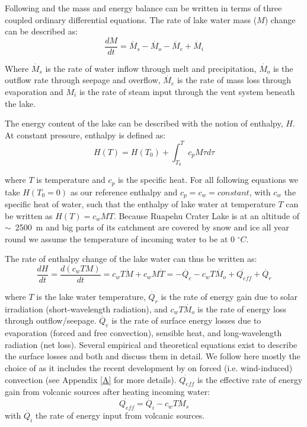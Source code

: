 \documentclass{bmc_template/bmcart}
\begin{document}
Following \cite{Hurst1991} and \cite{Stevenson1992} the mass and energy balance
can be written in terms of three coupled ordinary differential equations. The
rate of lake water mass ($M$) change can be described as:
\begin{equation}\label{ode_M}
	\frac{dM}{dt} = \dot{M_s} - \dot{M_o} - \dot{M_e} + \dot{M_i}
\end{equation}

Where $\dot{M_s}$ is the rate of water inflow through melt and precipitation,
$\dot{M_o}$
is the outflow rate through seepage and overflow, $\dot{M_e}$ is the rate of mass
loss through evaporation and $\dot{M_i}$ is the rate of steam input through the vent
system beneath the lake.

The energy content of the lake can be described with the notion of
enthalpy, $H$. At constant pressure, enthalpy is defined as:
\begin{equation}
	H(T) = H(T_0) + \int_{T_0}^{T}c_pM\tau d\tau
\end{equation}

where $T$ is temperature and $c_p$ is the specific heat. For all following
equations we take $H(T_0=0)$ as our reference enthalpy and $c_p=c_w=constant$,
with $c_w$ the specific heat of water, such that the enthalpy of lake water at
temperature $T$ can be written as $H(T) = c_wMT$. Because Ruapehu Crater Lake is
 at an altitude of $\sim$~2500~m and big parts of its catchment are covered by snow
and ice all year round we assume the temperature of incoming water to be at 0
$^{\circ}C$.

The rate of enthalpy change of the lake water can thus be written as:
\begin{equation}\label{ode_E}
    \frac{dH}{dt}=\frac{d(c_wTM)}{dt}=c_wT\dot{M} + c_wM\dot{T} =
	-\dot{Q_e} - c_wT\dot{M_o} + \dot{Q_{eff}} + \dot{Q_r}
\end{equation}
      
where $T$ is the lake water temperature, $\dot{Q_r}$ is
the rate of energy gain due to solar irradiation (short-wavelength radiation),
and $c_wT\dot{M_o}$ is the rate of energy loss through outflow/seepage. $\dot{Q_e}$ is
the rate of surface energy losses due to evaporation (forced and free
convection), sensible heat, and long-wavelength radiation (net loss). Several
empirical and theoretical equations exist to describe the surface losses and
both \cite{Stevenson1992} and \cite{hurstCraterLakeEnergy2015} discuss them in detail. We
follow here mostly the choice of \cite{hurstCraterLakeEnergy2015} as it includes the recent
development by \cite{sartoriCriticalReviewEquations2000} on forced (i.e. wind-induced) convection
(see Appendix \ref{A} for more details). $\dot{Q_{eff}}$ is the effective rate of
energy gain from volcanic sources after heating incoming water:
\begin{equation}
	\dot{Q_{eff}}=\dot{Q_i} - c_wT\dot{M_s}
\end{equation}
with $\dot{Q_i}$ the rate of energy input from volcanic sources.
\end{document}
